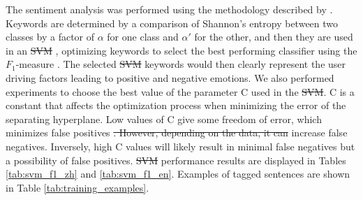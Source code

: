 \documentclass[smallextended,natbib]{svjour3}       %
\providecommand{\DIFadd}[1]{{\protect\color{blue}\uwave{#1}}} %
\providecommand{\DIFdel}[1]{{\protect\color{red}\sout{#1}}}                      %
\providecommand{\DIFaddbegin}{} %
\providecommand{\DIFaddend}{} %
\providecommand{\DIFdelbegin}{} %
\providecommand{\DIFdelend}{} %
\newcommand{\DIFscaledelfig}{0.5}
\newlength{\DIFdelgraphicswidth} %
\newlength{\DIFdelgraphicsheight} %
\newcommand{\DIFaddincludegraphics}[2][]{{\color{blue}\fbox{\DIFOincludegraphics[#1]{#2}}}} %
\newcommand{\DIFdelincludegraphics}[2][]{%
\sbox{\DIFdelgraphicsbox}{\DIFOincludegraphics[#1]{#2}}%
\settoboxwidth{\DIFdelgraphicswidth}{\DIFdelgraphicsbox} %
\settoboxtotalheight{\DIFdelgraphicsheight}{\DIFdelgraphicsbox} %
\scalebox{\DIFscaledelfig}{%
\parbox[b]{\DIFdelgraphicswidth}{\usebox{\DIFdelgraphicsbox}\\[-\baselineskip] \rule{\DIFdelgraphicswidth}{0em}}\llap{\resizebox{\DIFdelgraphicswidth}{\DIFdelgraphicsheight}{%
\setlength{\unitlength}{\DIFdelgraphicswidth}%
\begin{picture}(1,1)%
\thicklines\linethickness{2pt} %
{\color[rgb]{1,0,0}\put(0,0){\framebox(1,1){}}}%
{\color[rgb]{1,0,0}\put(0,0){\line( 1,1){1}}}%
{\color[rgb]{1,0,0}\put(0,1){\line(1,-1){1}}}%
\end{picture}%
}\hspace*{3pt}}} %
} %
\DeclareRobustCommand{\DIFaddbegin}{\DIFOaddbegin \let\includegraphics\DIFaddincludegraphics} %
\DeclareRobustCommand{\DIFaddend}{\DIFOaddend \let\includegraphics\DIFOincludegraphics} %
\DeclareRobustCommand{\DIFdelbegin}{\DIFOdelbegin \let\includegraphics\DIFdelincludegraphics} %
\DeclareRobustCommand{\DIFdelend}{\DIFOaddend \let\includegraphics\DIFOincludegraphics} %
\begin{document}
    The sentiment analysis was performed using the methodology described by \cite{Aleman2018ICAROB}. Keywords are determined by a comparison of Shannon's entropy \cite[][]{shannon1948} between two classes by a factor of \(\alpha\) for one class and \(\alpha'\) for the other, and then they are used in an \DIFdelbegin \DIFdel{SVM }\DIFdelend \DIFaddbegin \DIFadd{SVC }\DIFaddend \cite[][]{cortes1995}, optimizing keywords to select the best performing classifier using the \(F_1\)-measure \cite[][]{powers2011}. The selected \DIFdelbegin \DIFdel{SVM }\DIFdelend \DIFaddbegin \DIFadd{SVC }\DIFaddend keywords would then clearly represent the user driving factors leading to positive and negative emotions. We also performed experiments to choose the best value of the parameter C used in the \DIFdelbegin \DIFdel{SVM}\DIFdelend \DIFaddbegin \DIFadd{SVC}\DIFaddend . C is a constant that affects the optimization process when minimizing the error of the separating hyperplane. Low values of C give some freedom of error, which minimizes false positives \DIFdelbegin \DIFdel{. However, depending on the data, it can }\DIFdelend \DIFaddbegin \DIFadd{but can also }\DIFaddend increase false negatives. Inversely, high C values will likely result in minimal false negatives but a possibility of false positives. \DIFdelbegin \DIFdel{SVM }\DIFdelend \DIFaddbegin \DIFadd{SVC }\DIFaddend performance results are displayed in  Tables \ref{tab:svm_f1_zh} and \ref{tab:svm_f1_en}. Examples of tagged sentences are shown in Table \ref{tab:training_examples}. 
\end{document}

